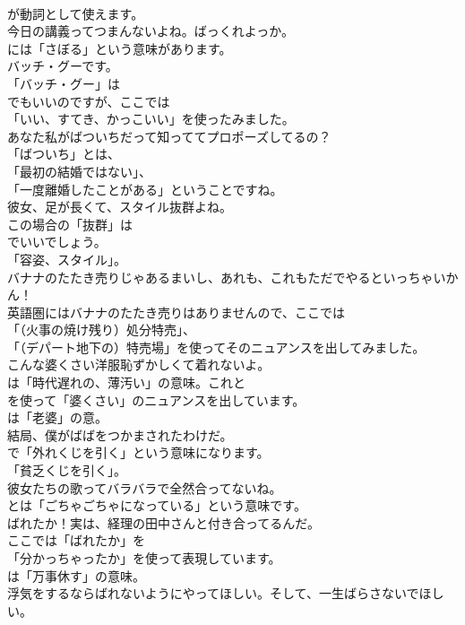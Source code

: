 \documentclass[8pt]{extreport}
\begin{document}
\begin{CJK}{UTF8}{min}
\\	が動詞として使えます。	
\\	今日の講義ってつまんないよね。ばっくれよっか。 
\\	には「さぼる」という意味があります。	
\\	バッチ・グーです。 
\\	「バッチ・グー」は
\\	でもいいのですが、ここでは
\\	「いい、すてき、かっこいい」を使ったみました。	
\\	あなた私がばついちだって知っててプロポーズしてるの？ 
\\	「ばついち」とは、
\\	「最初の結婚ではない」、
\\	「一度離婚したことがある」ということですね。	
\\	彼女、足が長くて、スタイル抜群よね。 
\\	この場合の「抜群」は
\\	でいいでしょう。
\\	「容姿、スタイル」。	
\\	バナナのたたき売りじゃあるまいし、あれも、これもただでやるといっちゃいかん！ 
\\	英語圏にはバナナのたたき売りはありませんので、ここでは
\\	「（火事の焼け残り）処分特売」、
\\	「（デパート地下の）特売場」を使ってそのニュアンスを出してみました。	
\\	こんな婆くさい洋服恥ずかしくて着れないよ。 
\\	は「時代遅れの、薄汚い」の意味。これと 
\\	を使って「婆くさい」のニュアンスを出しています。
\\	は「老婆」の意。	
\\	結局、僕がばばをつかまされたわけだ。 
\\	で「外れくじを引く」という意味になります。
\\	「貧乏くじを引く」。	
\\	彼女たちの歌ってバラバラで全然合ってないね。 
\\	とは「ごちゃごちゃになっている」という意味です。	
\\	ばれたか！実は、経理の田中さんと付き合ってるんだ。 
\\	ここでは「ばれたか」を
\\	「分かっちゃったか」を使って表現しています。
\\	は「万事休す」の意味。	
\\	浮気をするならばれないようにやってほしい。そして、一生ばらさないでほしい。 

\end{CJK}
\end{document}
